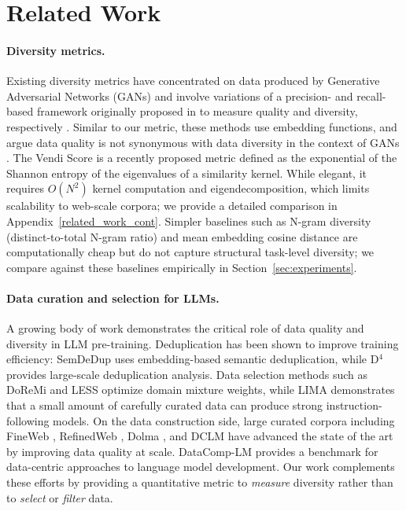 \section{Related Work}

\paragraph{Diversity metrics.}
Existing diversity metrics have concentrated on data produced by Generative Adversarial Networks (GANs) and involve variations of a precision- and recall-based framework originally proposed in \citep{sajjadi2018assessing} to measure quality and diversity, respectively \citep{kynkaanniemi2019improved, simon2019revisiting, naeem2020}.
Similar to our metric, these methods use embedding functions, and argue data quality is not synonymous with data diversity in the context of GANs \citep{fowl2020random}.
The Vendi Score \citep{friedman2022vendi} is a recently proposed metric defined as the exponential of the Shannon entropy of the eigenvalues of a similarity kernel.
While elegant, it requires $O(N^2)$ kernel computation and eigendecomposition, which limits scalability to web-scale corpora; we provide a detailed comparison in Appendix~\ref{related_work_cont}.
Simpler baselines such as N-gram diversity (distinct-to-total N-gram ratio) and mean embedding cosine distance are computationally cheap but do not capture structural task-level diversity; we compare against these baselines empirically in Section~\ref{sec:experiments}.

\paragraph{Data curation and selection for LLMs.}
A growing body of work demonstrates the critical role of data quality and diversity in LLM pre-training.
Deduplication has been shown to improve training efficiency: SemDeDup \citep{abbas2023semdedup, abbas2024effective} uses embedding-based semantic deduplication, while D$^4$ \citep{tirumala2023d4} provides large-scale deduplication analysis.
Data selection methods such as DoReMi \citep{xie2023doremi} and LESS \citep{xia2024less} optimize domain mixture weights, while LIMA \citep{zhou2023lima} demonstrates that a small amount of carefully curated data can produce strong instruction-following models.
On the data construction side, large curated corpora including FineWeb \citep{penedo2024fineweb}, RefinedWeb \citep{penedo2023refinedweb}, Dolma \citep{soldaini2024dolma}, and DCLM \citep{li2024datacomp} have advanced the state of the art by improving data quality at scale.
DataComp-LM \citep{li2024datacomp} provides a benchmark for data-centric approaches to language model development.
Our work complements these efforts by providing a quantitative metric to \textit{measure} diversity rather than to \textit{select} or \textit{filter} data.

